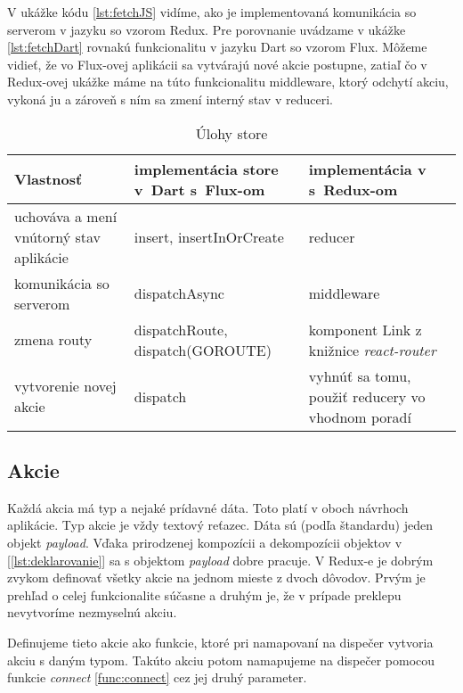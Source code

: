 V ukážke kódu \ref{lst:fetchJS} vidíme, ako je implementovaná komunikácia so serverom v jazyku \JS{} so vzorom Redux. Pre porovnanie uvádzame v ukážke \ref{lst:fetchDart} rovnakú funkcionalitu v jazyku Dart so vzorom Flux. Môžeme vidieť, že vo Flux-ovej aplikácii sa vytvárajú nové akcie postupne, zatiaľ čo v Redux-ovej ukážke máme na túto funkcionalitu middleware, ktorý odchytí akciu, vykoná ju a zároveň s ním sa zmení interný stav v reduceri.

\begin{table}
  \caption{Úlohy store}
  \label{table:store}
  \begin{tabular}{| p{4cm} | p{5cm} | p{5cm} |}
   \hline         %
     Vlastnosť & implementácia store v~Dart s~Flux-om & implementácia v~\JS{} s~Redux-om \\
    \hline
    \hline
     uchováva a mení vnútorný stav aplikácie & 
     insert, insertInOrCreate &
     reducer \\
    \hline
     komunikácia so serverom & 
     dispatchAsync & 
     middleware \\
    \hline
     zmena routy & 
     dispatchRoute, dispatch(GOROUTE) & 
     komponent Link z knižnice \emph{react-router} \\
    \hline
     vytvorenie novej akcie & 
     dispatch & 
     vyhnúť sa tomu, použiť reducery vo vhodnom poradí \\%
    \hline
   \end{tabular}
\end{table}



\subsection{Akcie}
\NEW{}
Každá akcia má typ a nejaké prídavné dáta. %
Toto platí v oboch návrhoch aplikácie. Typ akcie je vždy textový reťazec. Dáta sú (podľa štandardu) jeden objekt \emph{payload}. 
Vďaka prirodzenej kompozícii a dekompozícii objektov v \JS{} [\ref{lst:deklarovanie}] sa s objektom \emph{payload} dobre pracuje. 
V Redux-e je dobrým zvykom definovať všetky akcie na jednom mieste z dvoch dôvodov. Prvým je prehľad o celej funkcionalite súčasne a druhým je, že v prípade preklepu nevytvoríme nezmyselnú akciu.

Definujeme tieto akcie ako funkcie, ktoré pri namapovaní na dispečer vytvoria akciu s daným typom. Takúto akciu potom namapujeme na dispečer pomocou funkcie \emph{connect} \ref{func:connect} cez jej druhý parameter.

